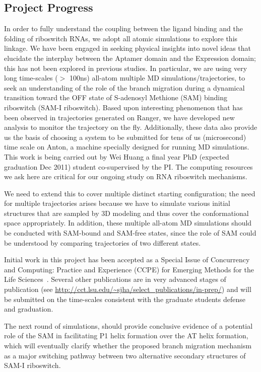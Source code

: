 \documentclass[a4paper,11pt]{article}
\begin{document}
\subsection{Project Progress}
In order to fully understand the coupling between the ligand binding
and the folding of riboswitch RNAs, we adopt all atomic simulations to
explore this linkage.  We have been engaged in seeking physical
insights into novel ideas that elucidate the interplay between the
Aptamer domain and the Expression domain; this has not been explored
in previous studies.  In particular, we are using very long
time-scales ($>$ 100ns) all-atom multiple MD simulations/trajectories,
to seek an understanding of the role of the branch migration during a
dynamical transition toward the OFF state of S-adenosyl Methione (SAM)
binding riboswitch (SAM-I riboswitch).  Based upon interesting
phenomenon that has been observed in trajectories generated on Ranger,
we have developed new analysis to monitor the trajectory on the
fly. Additionally, these data also provide us the basis of choosing a
system to be submitted for tens of us (microsecond) time scale on
Anton, a machine specially designed for running MD simulations. This
work is being carried out by Wei Huang a final year PhD (expected
graduation Dec 2011) student co-supervised by the PI.  The computing
resources we ask here are critical for our ongoing study on RNA
riboswitch mechanisms.

We need to extend this to cover multiple distinct starting configuration; the need for multiple trajectories arises because we have to simulate various initial structures that are sampled by 3D modeling and thus cover the conformational space appropriately.  In addition, these multiple all-atom MD simulations should be conducted with SAM-bound and SAM-free states, since the role of SAM could be understood by comparing trajectories of two different states.

Initial work in this project has been accepted as a Special Issue of
Concurrency and Computing: Practice and Experience (CCPE) for Emerging
Methods for the Life Sciences~\cite{ecmls_ccpe10}.  Several other
publications are in very advanced stages of publication (see
\url{http://cct.lsu.edu/~sjha/select_publications/in-prep/}) and will
be submitted on the time-scales consistent with the graduate students
defense and graduation.

The next round of simulations, should provide conclusive evidence of a potential role of the SAM in facilitating P1 helix formation over the AT helix formation, which will eventually clarify whether the proposed branch migration mechanism as a major switching pathway between two alternative secondary structures of SAM-I riboswitch.
\end{document}
